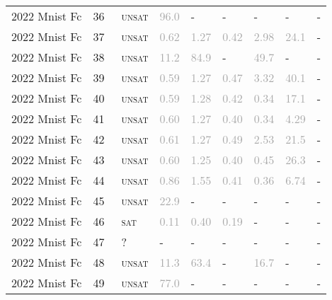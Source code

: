 \begin{center}
{\begin{longtable}{@{}lllllllll@{}}
2022 Mnist Fc & 36 & ~\textsc{unsat} & \textcolor{darkgray}{96.0} & - & - & - & - & - \\
2022 Mnist Fc & 37 & ~\textsc{unsat} & \textcolor{darkgray}{0.62} & \textcolor{darkgray}{1.27} & \textcolor{darkgray}{0.42} & \textcolor{darkgray}{2.98} & \textcolor{darkgray}{24.1} & - \\
2022 Mnist Fc & 38 & ~\textsc{unsat} & \textcolor{darkgray}{11.2} & \textcolor{darkgray}{84.9} & - & \textcolor{darkgray}{49.7} & - & - \\
2022 Mnist Fc & 39 & ~\textsc{unsat} & \textcolor{darkgray}{0.59} & \textcolor{darkgray}{1.27} & \textcolor{darkgray}{0.47} & \textcolor{darkgray}{3.32} & \textcolor{darkgray}{40.1} & - \\
2022 Mnist Fc & 40 & ~\textsc{unsat} & \textcolor{darkgray}{0.59} & \textcolor{darkgray}{1.28} & \textcolor{darkgray}{0.42} & \textcolor{darkgray}{0.34} & \textcolor{darkgray}{17.1} & - \\
2022 Mnist Fc & 41 & ~\textsc{unsat} & \textcolor{darkgray}{0.60} & \textcolor{darkgray}{1.27} & \textcolor{darkgray}{0.40} & \textcolor{darkgray}{0.34} & \textcolor{darkgray}{4.29} & - \\
2022 Mnist Fc & 42 & ~\textsc{unsat} & \textcolor{darkgray}{0.61} & \textcolor{darkgray}{1.27} & \textcolor{darkgray}{0.49} & \textcolor{darkgray}{2.53} & \textcolor{darkgray}{21.5} & - \\
2022 Mnist Fc & 43 & ~\textsc{unsat} & \textcolor{darkgray}{0.60} & \textcolor{darkgray}{1.25} & \textcolor{darkgray}{0.40} & \textcolor{darkgray}{0.45} & \textcolor{darkgray}{26.3} & - \\
2022 Mnist Fc & 44 & ~\textsc{unsat} & \textcolor{darkgray}{0.86} & \textcolor{darkgray}{1.55} & \textcolor{darkgray}{0.41} & \textcolor{darkgray}{0.36} & \textcolor{darkgray}{6.74} & - \\
2022 Mnist Fc & 45 & ~\textsc{unsat} & \textcolor{darkgray}{22.9} & - & - & - & - & - \\
2022 Mnist Fc & 46 & ~\textsc{sat} & \textcolor{darkgray}{0.11} & \textcolor{darkgray}{0.40} & \textcolor{darkgray}{0.19} & - & - & - \\
2022 Mnist Fc & 47 & ~? & - & - & - & - & - & - \\
2022 Mnist Fc & 48 & ~\textsc{unsat} & \textcolor{darkgray}{11.3} & \textcolor{darkgray}{63.4} & - & \textcolor{darkgray}{16.7} & - & - \\
2022 Mnist Fc & 49 & ~\textsc{unsat} & \textcolor{darkgray}{77.0} & - & - & - & - & - \\

\end{longtable}}
\end{center}
